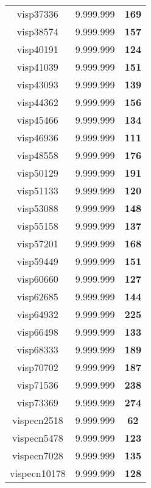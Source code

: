 \begin{tabular}{cc||c}
visp37336        & 9.999.999        & {\bf 169}       \\ 
visp38574        & 9.999.999        & {\bf 157}       \\ 
visp40191        & 9.999.999        & {\bf 124}       \\ 
visp41039        & 9.999.999        & {\bf 151}       \\ 
visp43093        & 9.999.999        & {\bf 139}       \\ 
visp44362        & 9.999.999        & {\bf 156}       \\ 
visp45466        & 9.999.999        & {\bf 134}       \\ 
visp46936        & 9.999.999        & {\bf 111}       \\ 
visp48558        & 9.999.999        & {\bf 176}       \\ 
visp50129        & 9.999.999        & {\bf 191}       \\ 
visp51133        & 9.999.999        & {\bf 120}       \\ 
visp53088        & 9.999.999        & {\bf 148}       \\ 
visp55158        & 9.999.999        & {\bf 137}       \\ 
visp57201        & 9.999.999        & {\bf 168}       \\ 
visp59449        & 9.999.999        & {\bf 151}       \\ 
visp60660        & 9.999.999        & {\bf 127}       \\ 
visp62685        & 9.999.999        & {\bf 144}       \\ 
visp64932        & 9.999.999        & {\bf 225}       \\ 
visp66498        & 9.999.999        & {\bf 133}       \\ 
visp68333        & 9.999.999        & {\bf 189}       \\ 
visp70702        & 9.999.999        & {\bf 187}       \\ 
visp71536        & 9.999.999        & {\bf 238}       \\ 
visp73369        & 9.999.999        & {\bf 274}       \\ 
vispecn2518      & 9.999.999        & {\bf 62}        \\ 
vispecn5478      & 9.999.999        & {\bf 123}       \\ 
vispecn7028      & 9.999.999        & {\bf 135}       \\ 
vispecn10178     & 9.999.999        & {\bf 128}       \\ 

\end{tabular}
